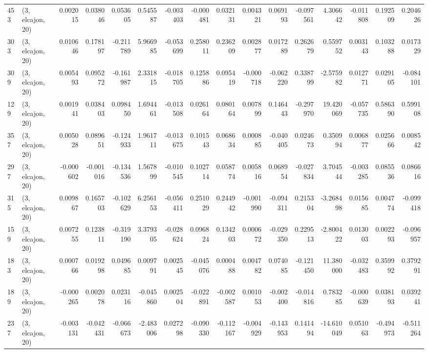 \begin{tabular}{llrrrrrrrrrrrrrr}
453 &  (3, elcajon, 20) &   0.002015 &  0.038046 &  0.053605 &    0.545587 & -0.003403 &  -0.000481 &  0.032131 &  0.004321 &  0.069193 & -0.097561 &    4.306642 & -0.011808 &  0.192509 &  0.204626 \\
303 &  (3, elcajon, 20) &   0.010646 &  0.178197 & -0.211789 &    5.966985 & -0.053699 &   0.258011 &  0.236209 &  0.002877 &  0.017289 &  0.262679 &    0.559752 &  0.003143 &  0.103288 &  0.017329 \\
309 &  (3, elcajon, 20) &   0.005493 &  0.095272 & -0.161987 &    2.331815 & -0.018705 &   0.125886 &  0.095419 & -0.000718 & -0.062220 &  0.338799 &   -2.575982 &  0.012771 &  0.029105 & -0.084101 \\
129 &  (3, elcajon, 20) &   0.001941 &  0.038403 &  0.098450 &    1.694461 & -0.013508 &   0.026164 &  0.080164 &  0.007899 &  0.146443 & -0.297970 &   19.420069 & -0.057735 &  0.586390 &  0.599108 \\
357 &  (3, elcajon, 20) &   0.005028 &  0.089651 & -0.124933 &    1.961711 & -0.013675 &   0.101543 &  0.068634 &  0.000885 & -0.040405 &  0.024673 &    0.350994 &  0.006877 &  0.025666 &  0.008542 \\
297 &  (3, elcajon, 20) &  -0.000602 & -0.001016 & -0.134536 &    1.567899 & -0.010545 &   0.102714 &  0.058774 &  0.005816 &  0.068954 & -0.027834 &    3.704544 & -0.003285 &  0.085536 &  0.086616 \\
315 &  (3, elcajon, 20) &   0.009867 &  0.165703 & -0.102629 &    6.256153 & -0.056411 &   0.251029 &  0.244942 & -0.001990 & -0.094311 &  0.215304 &   -3.268498 &  0.015685 &  0.004774 & -0.099418 \\
159 &  (3, elcajon, 20) &   0.007255 &  0.123811 & -0.319190 &    3.379305 & -0.028624 &   0.096824 &  0.134203 &  0.000672 & -0.029350 &  0.229513 &   -2.800422 &  0.013003 &  0.002293 & -0.096957 \\
183 &  (3, elcajon, 20) &   0.000766 &  0.019298 &  0.049685 &    0.009791 &  0.002545 &  -0.045076 &  0.000488 &  0.004782 &  0.074085 & -0.121450 &   11.380000 & -0.032483 &  0.359992 &  0.379291 \\
189 &  (3, elcajon, 20) &  -0.000265 &  0.002078 &  0.023116 &   -0.045860 &  0.002504 &  -0.022891 & -0.002587 &  0.001053 & -0.002400 & -0.014816 &    0.783285 & -0.000639 &  0.038193 &  0.039241 \\
237 &  (3, elcajon, 20) &  -0.003131 & -0.042431 & -0.066673 &   -2.483006 &  0.027298 &  -0.090330 & -0.112167 & -0.004929 & -0.143953 &  0.141494 &  -14.610049 &  0.051063 & -0.494973 & -0.511264 \\

\end{tabular}
